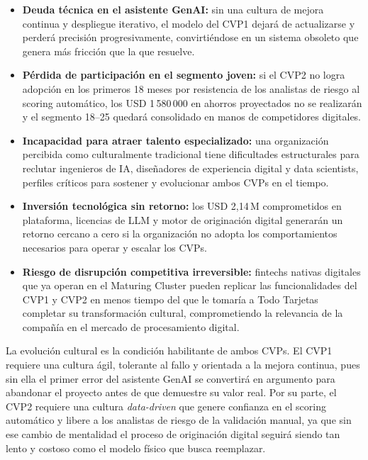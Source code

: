 \documentclass[12pt,letterpaper]{article}
\begin{document}
\begin{itemize}
  \item \textbf{Deuda técnica en el asistente GenAI:} sin una cultura de mejora continua y
    despliegue iterativo, el modelo del CVP1 dejará de actualizarse y perderá precisión
    progresivamente, convirtiéndose en un sistema obsoleto que genera más fricción que la que
    resuelve.
  \item \textbf{Pérdida de participación en el segmento joven:} si el CVP2 no logra adopción
    en los primeros 18 meses por resistencia de los analistas de riesgo al scoring automático,
    los USD 1\,580\,000 en ahorros proyectados no se realizarán y el segmento 18–25 quedará
    consolidado en manos de competidores digitales.
  \item \textbf{Incapacidad para atraer talento especializado:} una organización percibida como
    culturalmente tradicional tiene dificultades estructurales para reclutar ingenieros de IA,
    diseñadores de experiencia digital y data scientists, perfiles críticos para sostener y
    evolucionar ambos CVPs en el tiempo.
  \item \textbf{Inversión tecnológica sin retorno:} los USD 2,14\,M comprometidos en
    plataforma, licencias de LLM y motor de originación digital generarán un retorno cercano
    a cero si la organización no adopta los comportamientos necesarios para operar y escalar
    los CVPs.
  \item \textbf{Riesgo de disrupción competitiva irreversible:} fintechs nativas digitales que
    ya operan en el Maturing Cluster pueden replicar las funcionalidades del CVP1 y CVP2 en
    menos tiempo del que le tomaría a Todo Tarjetas completar su transformación cultural,
    comprometiendo la relevancia de la compañía en el mercado de procesamiento digital.
\end{itemize}

\bigskip

La evolución cultural es la condición habilitante de ambos CVPs. El CVP1 requiere una cultura
ágil, tolerante al fallo y orientada a la mejora continua, pues sin ella el primer error del
asistente GenAI se convertirá en argumento para abandonar el proyecto antes de que demuestre
su valor real. Por su parte, el CVP2 requiere una cultura \textit{data-driven} que genere
confianza en el scoring automático y libere a los analistas de riesgo de la validación manual,
ya que sin ese cambio de mentalidad el proceso de originación digital seguirá siendo tan lento
y costoso como el modelo físico que busca reemplazar.
\end{document}
